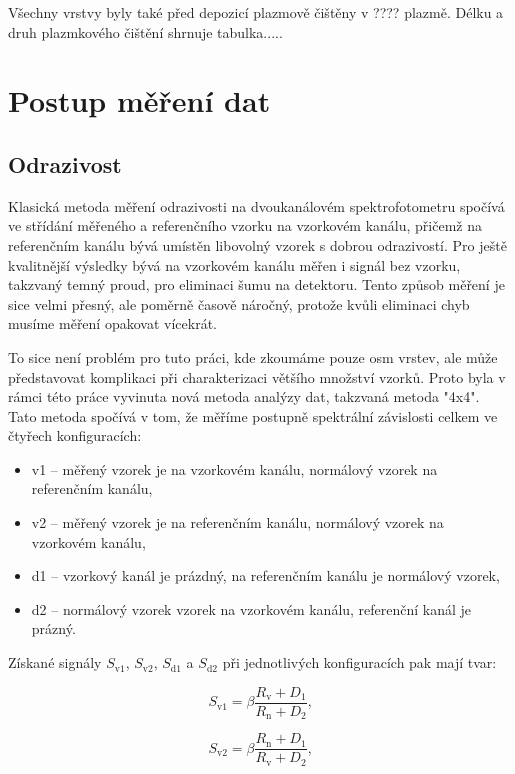 Všechny vrstvy byly také před depozicí plazmově čištěny v ???? plazmě. Délku a druh plazmkového čištění shrnuje tabulka.....

\section{Postup měření dat}

\subsection{Odrazivost}
Klasická metoda měření odrazivosti na dvoukanálovém spektrofotometru spočívá ve stří\-dá\-ní měřeného a referenčního vzorku na vzorkovém kanálu, přičemž na referenčním kanálu bývá umístěn libovolný vzorek s dobrou odrazivostí. 
Pro ještě kvalitnější výsledky bývá na vzorkovém kanálu měřen i signál bez vzorku, takzvaný temný proud, pro eliminaci šumu na detektoru. Tento způsob měření je sice velmi přesný, ale poměrně časově náročný, protože kvůli eliminaci chyb musíme měření opakovat vícekrát.

To sice není problém pro tuto práci, kde zkoumáme pouze osm vrstev, ale může představovat komplikaci při charakterizaci většího množství vzorků. Proto byla v rámci této práce vyvinuta nová metoda analýzy dat, takzvaná metoda "4x4". Tato metoda spočívá v tom, že měříme postupně spektrální závislosti celkem ve čtyřech konfiguracích:
\begin{itemize}
  \item v1 -- měřený vzorek je na vzorkovém kanálu, normálový vzorek na referenčním kanálu,
  \item v2 -- měřený vzorek je na referenčním kanálu, normálový vzorek na vzorkovém kanálu,
  \item d1 -- vzorkový kanál je prázdný, na referenčním kanálu je normálový vzorek,
  \item d2 -- normálový vzorek vzorek na vzorkovém kanálu, referenční kanál je prázný.
\end{itemize}

Získané signály $S_\mathrm{v1}$, $S_\mathrm{v2}$, $S_\mathrm{d1}$ a $S_\mathrm{d2}$ při jednotlivých konfiguracích pak mají tvar:

\begin{equation}
S_\mathrm{v1} = \beta \frac{R_\mathrm{v} + D_1}{R_\mathrm{n} + D_2} \text{,}
\end{equation}

\begin{equation}
S_\mathrm{v2} = \beta \frac{R_\mathrm{n} + D_1}{R_\mathrm{v} + D_2} \text{,}
\end{equation}

